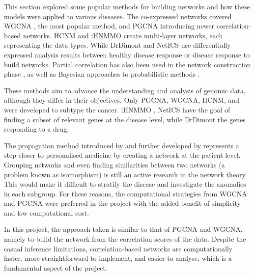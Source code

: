 This section explored some popular methods for building networks and how these models were applied to various diseases. The co-expressed networks covered WGCNA \citep{Langfelder2008-sn}, the most popular method, and PGCNA \citep{Care2019-ij} introducing newer correlation-based networks. HCNM \citep{Vangimalla2021-fc} and iHNMMO \citep{Peng2017-ik} create multi-layer networks, each representing the data types. While DrDimont \citep{Hiort2022-lk} and NetICS \citep{Dimitrakopoulos2018-br} use differentially expressed analysis results between healthy disease response or disease response to build networks. Partial correlation has also been used in the network construction phase \citep{De_la_Fuente2004-ts}, as well as Bayesian approaches to probabilistic methods \citep{Nakazawa2021-yq, Tamada2011-ok, Tanaka2020-mw}.

These methods aim to advance the understanding and analysis of genomic data, although they differ in their objectives. Only PGCNA, WGCNA, HCNM, and \citep{Nakazawa2021-yq} were developed to subtype the cancer. iHNMMO \citep{Peng2017-ik}, NetICS \citep{Dimitrakopoulos2018-br} have the goal of finding a subset of relevant genes at the disease level, while DrDimont \citep{Hiort2022-lk} the genes responding to a drug. 

The propagation method introduced by \citet{Hofree2013-ld} and further developed by \citet{He2017-dj} represents a step closer to personalised medicine by creating a network at the patient level. Grouping networks and even finding similarities between two networks (a problem known as isomorphism) is still an active research in the network theory. This would make it difficult to stratify the disease and investigate the anomalies in each subgroup. For these reasons, the computational strategies from WGCNA and PGCNA were preferred in the project with the added benefit of simplicity and low computational cost.


In this project, the approach taken is similar to that of PGCNA and WGCNA, namely to build the network from the correlation scores of the data. Despite the casual inference limitations, correlation-based networks are computationally faster, more straightforward to implement, and easier to analyse, which is a fundamental aspect of the project.